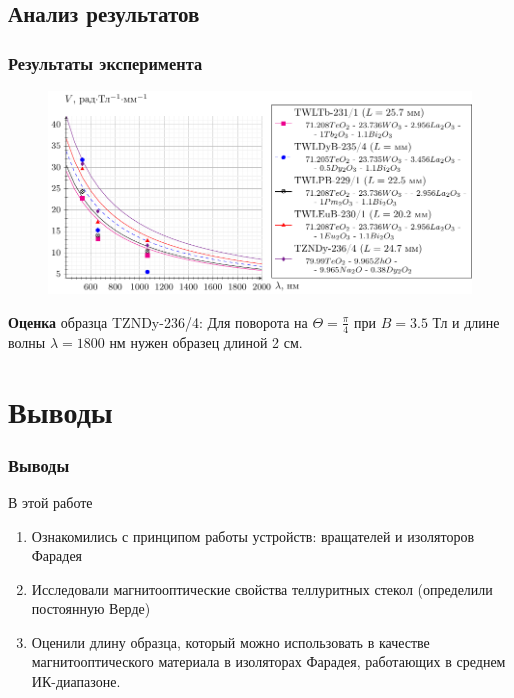 \documentclass[10pt,pdf,hyperref={unicode}, dvipsnames]{beamer}
\begin{document}

\begin{frame}[t]
	\subsection{Анализ результатов}
	\frametitle{Результаты эксперимента}
	
	\begin{figure}[tb]
		\centering
		\includegraphics[width=1\textwidth]{images/graph_verde_from_lambda}
	\end{figure}
	
	\textbf{Оценка} образца TZNDy-236/4: Для поворота на $\Theta=\frac{\pi}{4}$ при $B=3.5$ Тл и длине волны $\lambda=1800$ нм нужен образец длиной 2 см.
	
	
	
\end{frame}


\section{Выводы}
\begin{frame}
	\frametitle{Выводы}
	В этой работе 
	\begin{enumerate} 
		\item 
			  Ознакомились с принципом работы устройств: вращателей и изоляторов Фарадея
		\item 
		      Исследовали магнитооптические свойства теллуритных стекол (определили постоянную Верде)
		\item 
		      Оценили длину образца, который можно использовать в качестве магнитооптического материала в изоляторах Фарадея, работающих в среднем ИК-диапазоне.
	\end{enumerate}
\end{frame}
\end{document}
